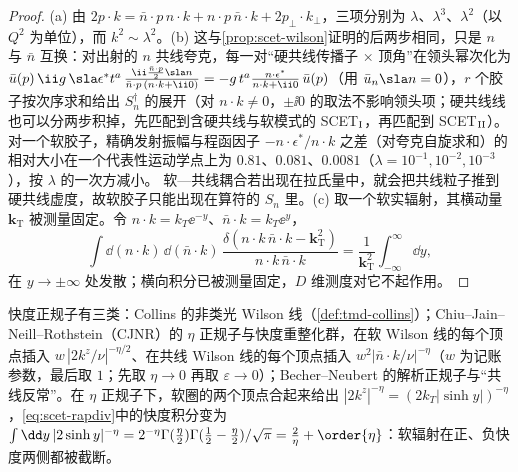 \begin{proof}
(a) 由 $2p\cdot k=\bar n\cdot p\,n\cdot k+n\cdot p\,\bar n\cdot k+2p_\perp\cdot k_\perp$，三项分别为 $\lambda$、$\lambda^3$、$\lambda^2$（以 $Q^2$ 为单位），而 $k^2\sim\lambda^2$。(b) 这与\cref{prop:scet-wilson}证明的后两步相同，只是 $n$ 与 $\bar n$ 互换：对出射的 $n$ 共线夸克，每一对“硬共线传播子 × 顶角”在领头幂次化为 $\bar u(p)\,\ii g\,\sla\epsilon^*t^a\,\frac{\ii\frac{\bar n\cdot p}{2}\sla n}{\bar n\cdot p\,(n\cdot k+\ii0)}=-g\,t^a\frac{n\cdot\epsilon^*}{n\cdot k+\ii0}\,\bar u(p)$（用 $\bar u_n\sla n=0$），$r$ 个胶子按次序求和给出 $S_n^\dagger$ 的展开（对 $n\cdot k\neq0$，$\pm\ii0$ 的取法不影响领头项；硬共线线也可以分两步积掉，先匹配到含硬共线与软模式的 SCET$_{\rm I}$，再匹配到 SCET$_{\rm II}$\cite{BauerEtAl2002,Hill:2002vw}）。对一个软胶子，精确发射振幅与程函因子 $-n\cdot\epsilon^*/n\cdot k$ 之差（对夸克自旋求和）的相对大小在一个代表性运动学点上为 $0.81$、$0.081$、$0.0081$（$\lambda=10^{-1},10^{-2},10^{-3}$），按 $\lambda$ 的一次方减小。%
软—共线耦合若出现在拉氏量中，就会把共线粒子推到硬共线虚度，故软胶子只能出现在算符的 $S_n$ 里。(c) 取一个软实辐射，其横动量 $\bm k_{\mathrm T}$ 被测量固定。令 $n\cdot k=k_T\ee^{-y}$、$\bar n\cdot k=k_T\ee^{y}$，
\begin{equation}\label{eq:scet-rapdiv}
\int\dd(n\cdot k)\,\dd(\bar n\cdot k)\,\frac{\delta(n\cdot k\,\bar n\cdot k-\bm k_{\mathrm T}^2)}{n\cdot k\,\bar n\cdot k}=\frac{1}{\bm k_{\mathrm T}^2}\int_{-\infty}^{\infty}\dd y ,
\end{equation}
在 $y\to\pm\infty$ 处发散；横向积分已被测量固定，$D$ 维测度对它不起作用。
\end{proof}

快度正规子有三类：Collins 的非类光 Wilson 线（\cref{def:tmd-collins}）；Chiu--Jain--Neill--Rothstein（CJNR）的 $\eta$ 正规子与快度重整化群\cite{ChiuEtAl2012a,ChiuEtAl2012b}，在软 Wilson 线的每个顶点插入 $w\,|2k^z/\nu|^{-\eta/2}$、在共线 Wilson 线的每个顶点插入 $w^2|\bar n\cdot k/\nu|^{-\eta}$（$w$ 为记账参数，最后取 $1$；先取 $\eta\to0$ 再取 $\varepsilon\to0$）\cite[式~(4.8)、(4.9)]{ChiuEtAl2012b}；Becher--Neubert 的解析正规子与“共线反常”\cite{BecherNeubert2011}。在 $\eta$ 正规子下，软圈的两个顶点合起来给出 $|2k^z|^{-\eta}=(2k_T|\sinh y|)^{-\eta}$，\cref{eq:scet-rapdiv}中的快度积分变为 $\int\dd y\,|2\sinh y|^{-\eta}=2^{-\eta}\Gamma(\tfrac\eta2)\Gamma(\tfrac12-\tfrac\eta2)/\sqrt\pi=\tfrac2\eta+\order{\eta}$：软辐射在正、负快度两侧都被截断。%

